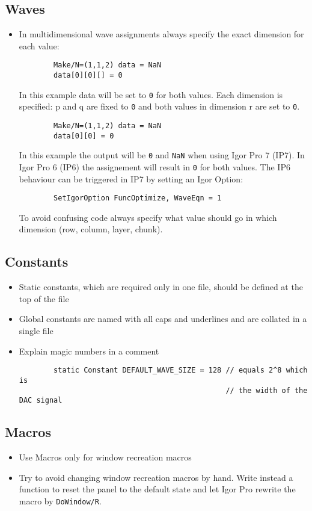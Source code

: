 \documentclass{scrartcl}
\begin{document}
\subsection{Waves}
%
\begin{itemize}
	\item In multidimensional wave assignments always specify the exact dimension for each value:
	\begin{verbatim}
		Make/N=(1,1,2) data = NaN
		data[0][0][] = 0
	\end{verbatim}
	In this example data will be set to \texttt{0} for both values.
	Each dimension is specified: p and q are fixed to \texttt{0} and both values in dimension r are set to \texttt{0}.
%
	\begin{verbatim}
		Make/N=(1,1,2) data = NaN
		data[0][0] = 0
	\end{verbatim}
	In this example the output will be \texttt{0} and \texttt{NaN} when using Igor Pro 7 (IP7).
	In Igor Pro 6 (IP6) the assignement will result in \texttt{0} for both values. \newline
	The IP6 behaviour can be triggered in IP7 by setting an Igor Option:
	\begin{verbatim}
		SetIgorOption FuncOptimize, WaveEqn = 1
	\end{verbatim}
	To avoid confusing code always specify what value should go in which dimension (row, column, layer, chunk).
\end{itemize}
\subsection{Constants}
%
\begin{itemize}
	\item Static constants, which are required only in one file, should be defined at the top of the file
%
	\item Global constants are named with all caps and underlines and are collated in a single file
%
	\item Explain magic numbers in a comment
	\begin{verbatim}
		static Constant DEFAULT_WAVE_SIZE = 128 // equals 2^8 which is
		                                        // the width of the DAC signal
	\end{verbatim}
\end{itemize}
%
\subsection{Macros}
\begin{itemize}
	\item Use Macros only for window recreation macros
%
	\item Try to avoid changing window recreation macros by hand. Write instead a function to reset the panel to
	      the default state and let Igor Pro rewrite the macro by \texttt{DoWindow/R}.
\end{itemize}
%
\end{document}
